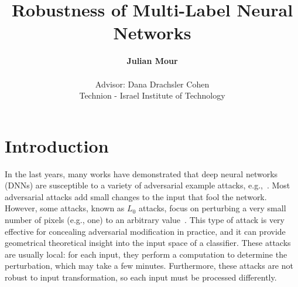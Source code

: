 \documentclass[11pt]{article}
\newcommand{\Dana}[1]{\textcolor{purple}{\bf Dana: #1}}
\begin{document}
\title{Robustness of Multi-Label Neural Networks}

\author{
    \textbf{Julian Mour} \\
    \\
    Advisor: Dana Drachsler Cohen\\
    Technion - Israel Institute of Technology
}

\maketitle

\section{Introduction}

In the last years, many works have demonstrated that deep neural networks (DNNs) are susceptible to a variety of adversarial example attacks, e.g.,~\cite{ref7,ref15,szegedy2014intriguing,ref17,ref29,ref56}.
Most adversarial attacks add small changes to the input that fool the network.
However, some attacks, known as $L_0$ attacks, focus on perturbing a very small number of pixels (e.g., one) to an arbitrary value~\cite{OnePixelAttack, alatalo2021chromatic, vargas2019understanding}.
This type of attack is very effective for concealing adversarial modification in practice, and it can provide geometrical theoretical insight into the input space of a classifier.
These attacks are usually local: for each input, they perform a computation to determine the perturbation, which may take a few minutes.
Furthermore, these attacks are not robust to input transformation, so each input must be processed differently.
\end{document}
